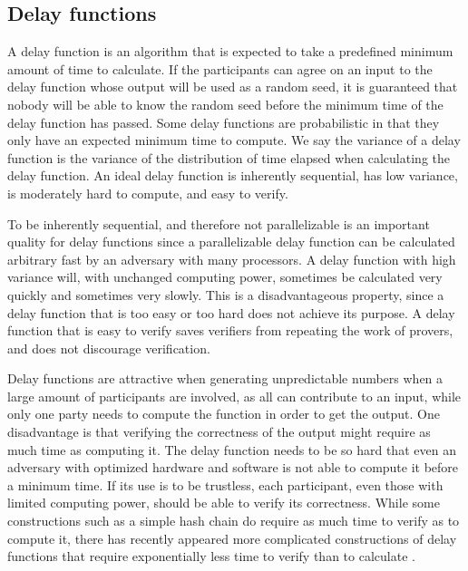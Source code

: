 \subsection{Delay functions}
A delay function is an algorithm that is expected to take a predefined minimum amount of time to calculate. If the participants can agree on an input to the delay function whose output will be used as a random seed, it is guaranteed that nobody will be able to know the random seed before the minimum time of the delay function has passed. Some delay functions are probabilistic in that they only have an expected minimum time to compute. We say the variance of a delay function is the variance of the distribution of time elapsed when calculating the delay function. An ideal delay function is inherently sequential, has low variance, is moderately hard to compute, and easy to verify.

To be inherently sequential, and therefore not parallelizable is an important quality for delay functions since a parallelizable delay function can be calculated arbitrary fast by an adversary with many processors. A delay function with high variance will, with unchanged computing power, sometimes be calculated very quickly and sometimes very slowly. This is a disadvantageous property, since a delay function that is too easy or too hard does not achieve its purpose. A delay function that is easy to verify saves verifiers from repeating the work of provers, and does not discourage verification.

Delay functions are attractive when generating unpredictable numbers when a large amount of participants are involved, as all can contribute to an input, while only one party needs to compute the function in order to get the output. One disadvantage is that verifying the correctness of the output might require as much time as computing it. The delay function needs to be so hard that even an adversary with optimized hardware and software is not able to compute it before a minimum time. If its use is to be trustless, each participant, even those with limited computing power, should be able to verify its correctness. While some constructions such as a simple hash chain do require as much time to verify as to compute it, there has recently appeared more complicated constructions of delay functions that require exponentially less time to verify than to calculate \cite{boneh_verifiable_2018}.


